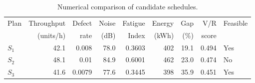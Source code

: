 \begin{table}[htbp]
\centering
\caption{Numerical comparison of candidate schedules.}
\label{tab:numerical-sim}
\small
\begin{tabular}{@{}lrrrrrrrl@{}}
\toprule
Plan & Throughput & Defect & Noise & Fatigue & Energy & Gap & V/R & Feasible \\
     & (units/h)  & rate   & (dB)  & Index   & (kWh)  & (\%) & score &         \\
\midrule
$S_{1}$ & 42.1 & 0.008 & 78.0 & 0.3603 & 402 & 19.1 & 0.494 & Yes \\
$S_{2}$ & 48.1 & 0.01 & 84.9 & 0.6001 & 462 & 23.0 & 0.474 & No \\
$S_{3}$ & 41.6 & 0.0079 & 77.6 & 0.3445 & 398 & 35.9 & 0.451 & Yes \\
\bottomrule
\end{tabular}
\end{table}
